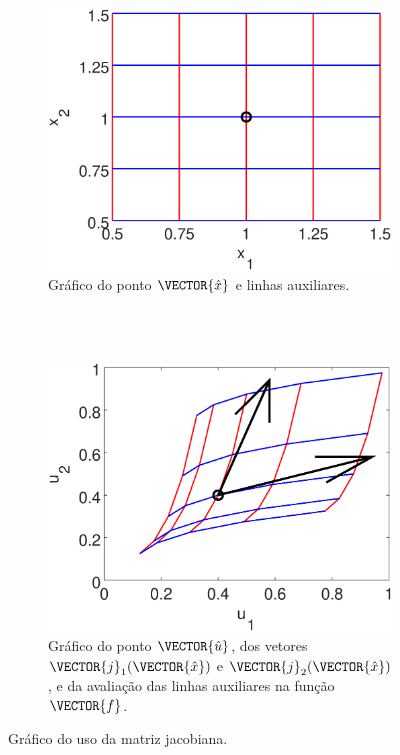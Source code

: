 \begin{figure}[!h]
    \centering
    \begin{subfigure}[b]{0.46\textwidth}
        \includegraphics[width=\textwidth]{chapters/derivada/mfiles/jacobian/jacobian1.eps}
        \caption{Gráfico do ponto $\VECTOR{\hat{x}}$ e linhas auxiliares. ~~~~~~~~~ ~~~~~~~~~ ~~~~~~~~~}
        \label{fig:ex:jacobiano:x}
    \end{subfigure}
    ~ %
    \begin{subfigure}[b]{0.46\textwidth}
        \includegraphics[width=\textwidth]{chapters/derivada/mfiles/jacobian/jacobian2.eps}
        \caption{Gráfico do ponto $\VECTOR{\hat{u}}$, dos vetores $\VECTOR{j}_{1}(\VECTOR{\hat{x}})$ e
    $\VECTOR{j}_{2}(\VECTOR{\hat{x}})$, e da avaliação das linhas auxiliares na função $\VECTOR{f}$.}
        \label{fig:ex:jacobiano:u}
    \end{subfigure}
    \caption{Gráfico do uso da matriz jacobiana.}
    \label{fig:ex:jacobiano}
\end{figure}

